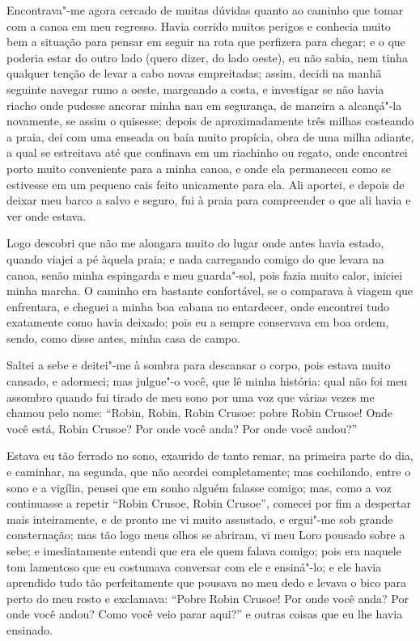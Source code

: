 Encontrava"-me agora cercado de muitas dúvidas quanto ao caminho que
tomar com a canoa em meu regresso. Havia corrido muitos perigos e
conhecia muito bem a situação para pensar em seguir na rota que
perfizera para chegar; e o que poderia estar do outro lado (quero dizer,
do lado oeste), eu não sabia, nem tinha qualquer tenção de levar a cabo
novas empreitadas; assim, decidi na manhã seguinte navegar rumo a oeste,
margeando a costa, e investigar se não havia riacho onde pudesse ancorar
minha nau em segurança, de maneira a alcançá"-la novamente, se assim o
quisesse; depois de aproximadamente três milhas costeando a praia, dei
com uma enseada ou baía muito propícia, obra de uma milha adiante, a
qual se estreitava até que confinava em um riachinho ou regato, onde
encontrei porto muito conveniente para a minha canoa, e onde ela
permaneceu como se estivesse em um pequeno cais feito unicamente para
ela. Ali aportei, e depois de deixar meu barco a salvo e seguro, fui à
praia para compreender o que ali havia e ver onde estava.

Logo descobri que não me alongara muito do lugar onde antes havia
estado, quando viajei a pé àquela praia; e nada carregando comigo do que
levara na canoa, senão minha espingarda e meu guarda"-sol, pois fazia
muito calor, iniciei minha marcha. O caminho era bastante confortável,
se o comparava à viagem que enfrentara, e cheguei a minha boa cabana no
entardecer, onde encontrei tudo exatamente como havia deixado; pois eu a
sempre conservava em boa ordem, sendo, como disse antes, minha casa de
campo.

Saltei a sebe e deitei"-me à sombra para descansar o corpo, pois estava
muito cansado, e adormeci; mas julgue"-o você, que lê minha história:
qual não foi meu assombro quando fui tirado de meu sono por uma voz que
várias vezes me chamou pelo nome: ``Robin, Robin, Robin Crusoe: pobre
Robin Crusoe! Onde você está, Robin Crusoe? Por onde você anda? Por onde
você andou?''

Estava eu tão ferrado no sono, exaurido de tanto remar, na primeira
parte do dia, e caminhar, na segunda, que não acordei completamente; mas
cochilando, entre o sono e a vigília, pensei que em sonho alguém falasse
comigo; mas, como a voz continuasse a repetir ``Robin Crusoe, Robin
Crusoe'', comecei por fim a despertar mais inteiramente, e de pronto me
vi muito assustado, e ergui"-me sob grande consternação; mas tão logo
meus olhos se abriram, vi meu Loro pousado sobre a sebe; e imediatamente
entendi que era ele quem falava comigo; pois era naquele tom lamentoso
que eu costumava conversar com ele e ensiná"-lo; e ele havia aprendido
tudo tão perfeitamente que pousava no meu dedo e levava o bico para
perto do meu rosto e exclamava: ``Pobre Robin Crusoe! Por onde você
anda? Por onde você andou? Como você veio parar aqui?'' e outras coisas
que eu lhe havia ensinado.

